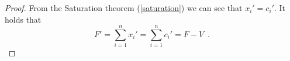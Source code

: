 \begin{proof}
    From the Saturation theorem (\ref{saturation}) we can see that $x_i' = c_i'$. It holds that
    \begin{equation*}
       F' = \sum\limits_{i=1}^nx_i' = \sum\limits_{i=1}^nc_i' = F - V \enspace.
    \end{equation*}
\end{proof}
